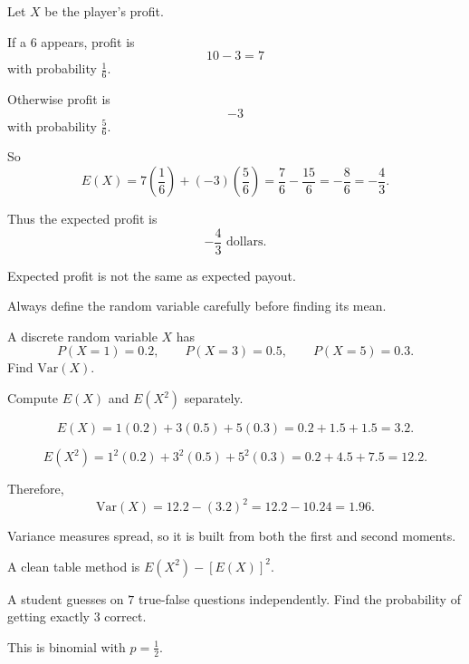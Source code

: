 \begin{solution}
Let $X$ be the player's profit.

If a $6$ appears, profit is
\[
10-3=7
\]
with probability $\frac16$.

Otherwise profit is
\[
-3
\]
with probability $\frac56$.

So
\[
E(X)=7\left(\frac16\right)+(-3)\left(\frac56\right)
=\frac76-\frac{15}{6}
=-\frac86=-\frac43.
\]

Thus the expected profit is
\[
\boxed{-\frac43\text{ dollars}}.
\]
\end{solution}

\begin{takeaways}
\item Expected profit is not the same as expected payout.
\item Always define the random variable carefully before finding its mean.
\end{takeaways}

\begin{problem}
A discrete random variable $X$ has
\[
P(X=1)=0.2,\qquad P(X=3)=0.5,\qquad P(X=5)=0.3.
\]
Find $\mathrm{Var}(X)$.
\end{problem}

\begin{hint}
Compute $E(X)$ and $E(X^2)$ separately.
\end{hint}

\begin{solution}
\[
E(X)=1(0.2)+3(0.5)+5(0.3)=0.2+1.5+1.5=3.2.
\]

\[
E(X^2)=1^2(0.2)+3^2(0.5)+5^2(0.3)=0.2+4.5+7.5=12.2.
\]

Therefore,
\[
\mathrm{Var}(X)=12.2-(3.2)^2=12.2-10.24=1.96.
\]
\end{solution}

\begin{takeaways}
\item Variance measures spread, so it is built from both the first and second moments.
\item A clean table method is $E(X^2)-[E(X)]^2$.
\end{takeaways}

\begin{problem}
A student guesses on $7$ true-false questions independently. Find the probability of getting exactly $3$ correct.
\end{problem}

\begin{hint}
This is binomial with $p=\frac12$.
\end{hint}

